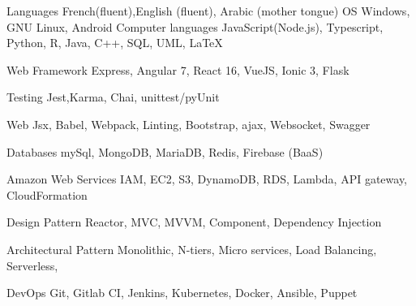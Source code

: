 

\begin{cvskills}
  \cvskill
    {Languages } %
    {French(fluent),English (fluent), Arabic (mother tongue)} %
  \cvskill
    {OS} %
    {Windows, GNU Linux, Android} %
  \cvskill
    {Computer languages} %
    {JavaScript(Node.js), Typescript, Python, R, Java, C++, SQL, UML, LaTeX} %

  \cvskill
    {Web Framework} %
    {Express, Angular 7, React 16, VueJS, Ionic 3, Flask} %
    
  \cvskill
    {Testing} %
    {Jest,Karma, Chai, unittest/pyUnit  } %
    

  \cvskill
    {Web} %
    {Jsx, Babel, Webpack, Linting, Bootstrap, ajax, Websocket, Swagger} %

  \cvskill
    {Databases} %
    {mySql, MongoDB, MariaDB, Redis, Firebase (BaaS) } %

\cvskill
    {Amazon Web Services} %
    {IAM, EC2, S3, DynamoDB, RDS, Lambda, API gateway, CloudFormation } %

  \cvskill
    {Design Pattern} %
    { Reactor, MVC, MVVM, Component, Dependency Injection  } %
    
  \cvskill
    {Architectural Pattern} %
    {Monolithic, N-tiers, Micro services, Load Balancing, Serverless,  } %

  \cvskill
    {DevOps} %
    {Git, Gitlab CI, Jenkins, Kubernetes, Docker, Ansible, Puppet } %


\end{cvskills}
